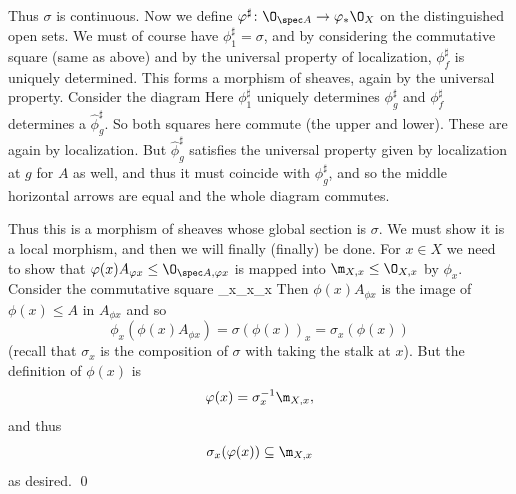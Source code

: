 Thus $\sigma$ is continuous.
Now we define $\phi^\sharp\colon\O_{\spec A}\to\phi_*\O_X$ on the distinguished open sets.
We must of course have $\phi^\sharp_1=\sigma$, and by considering the commutative square (same as above)
and by the universal property of localization, $\phi^\sharp_f$ is uniquely determined.
This forms a morphism of sheaves, again by the universal property.
Consider the diagram
Here $\phi^\sharp_1$ uniquely determines $\phi^\sharp_g$ and $\phi^\sharp_f$ determines a $\hat\phi^\sharp_g$.
So both squares here commute (the upper and lower).
These are again by localization.
But $\hat\phi^\sharp_g$ satisfies the universal property given by localization at $g$ for $A$ as well,
and thus it must coincide with $\phi^\sharp_g$, and so the middle horizontal arrows are equal and the
whole diagram commutes.

Thus this is a morphism of sheaves whose global section is $\sigma$.
We must show it is a local morphism, and then we will finally (finally) be done.
For $x\in X$ we need to show that $\phi(x)A_{\phi x}\leq\O_{\spec A,\phi x}$ is mapped into
$\m_{X,x}\leq\O_{X,x}$ by $\phi_x$.
Consider the commutative square
    {\sigma}{\phi_x}{\bul_{\phi x}}{\bul_x}
Then $\phi(x)A_{\phi x}$ is the image of $\phi(x)\leq A$ in $A_{\phi x}$ and so
$$ \phi_x(\phi(x)A_{\phi x}) = \sigma(\phi(x))_x = \sigma_x(\phi(x)) $$
(recall that $\sigma_x$ is the composition of $\sigma$ with taking the stalk at $x$).
But the definition of $\phi(x)$ is
$$ \phi(x) = \sigma_x^{-1}\m_{X,x} , $$
and thus
$$ \sigma_x(\phi(x)) \subseteq \m_{X,x} $$
as desired.
\qed

